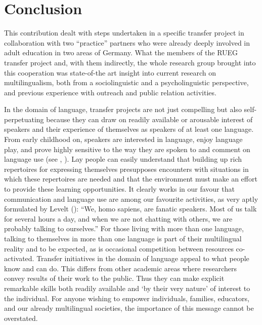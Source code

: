 \documentclass[output=paper,colorlinks,citecolor=brown]{langscibook}
\begin{document}
\section{Conclusion} \label{sec:purkathoferetal:7}

This contribution dealt with steps undertaken in a specific transfer project in collaboration with two “practice” partners who were already deeply involved in adult education in two areas of Germany. What the members of the RUEG transfer project and, with them indirectly, the whole research group brought into this cooperation was state-of-the art insight into current research on multilingualism, both from a sociolinguistic and a psycholinguistic perspective, and previous experience with outreach and public relation activities.

In the domain of language, transfer projects are not just compelling but also self-perpetuating because they can draw on readily available or arousable interest of speakers and their experience of themselves as speakers of at least one language. From early childhood on, speakers are interested in language, enjoy language play, and prove highly sensitive to the way they are spoken to and comment on language use (see \cite{Tracy2008}, \cite{Tracy&Gawlitzek2023}).
Lay people can easily understand that building up rich repertoires for expressing themselves presupposes encounters with situations in which these repertoires are needed and that the environment must make an effort to provide these learning opportunities. It clearly works in our favour that communication and language use are among our  favourite activities, as very aptly formulated by Levelt (\citeyear[169]{Levelt1989}): “We, homo sapiens, are fanatic speakers. Most of us talk for several hours a day, and when we are not chatting with others, we are probably talking to ourselves.” For those living with more than one language, talking to themselves in more than one language is part of their multilingual reality and to be expected, as is occasional competition between resources co-activated.
Transfer initiatives in the domain of language appeal to what people know and can do. This differs from other academic areas where researchers convey results of their work to the public. Thus they can make explicit remarkable skills both readily available and ‘by their very nature’ of interest to the individual. For anyone wishing to empower individuals, families, educators, and our already multilingual societies, the importance of this message cannot be overstated.
\end{document}
